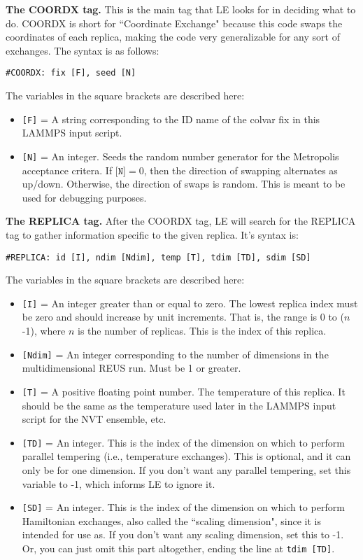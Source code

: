 \documentclass[10pt]{article}
\begin{document}
\textbf{The COORDX tag.}
This is the main tag that LE looks for in deciding what to do. COORDX is
short for ``Coordinate Exchange" because this code swaps the coordinates of each replica,
making the code very generalizable for any sort of exchanges.
The syntax is as follows:
\begin{verbatim}
#COORDX: fix [F], seed [N]
\end{verbatim}
The variables in the square brackets are described here:
\begin{itemize}
\item	\texttt{[F]} = A string corresponding to the ID name of the colvar fix
		in this LAMMPS input script.
\item	\texttt{[N]} = An integer. Seeds the random number generator for the Metropolis
		acceptance critera.
		If $\texttt{[N]} = 0$,
		then the direction of swapping alternates as up/down. Otherwise, the direction of swaps
		is random. This is meant to be used for debugging purposes.
\end{itemize}

\textbf{The REPLICA tag.}
After the COORDX tag, LE will search for the REPLICA tag to gather information specific
to the given replica. It's syntax is:
\begin{verbatim}
#REPLICA: id [I], ndim [Ndim], temp [T], tdim [TD], sdim [SD]
\end{verbatim}
The variables in the square brackets are described here:
\begin{itemize}
\item	\texttt{[I]} = An integer greater than or equal to zero. The lowest
		replica index must be zero and should increase by unit increments. That is,
		the range is 0 to ($n$-1), where $n$ is the number of replicas. This is
		the index of this replica.
\item	\texttt{[Ndim]} = An integer corresponding to the number of dimensions
		in the multidimensional REUS run. Must be 1 or greater.
\item	\texttt{[T]} = A positive floating point number. The temperature of this replica.
		It should be the same as the temperature used later in the LAMMPS input script
		for the NVT ensemble, etc.
\item	\texttt{[TD]} = An integer. This is the index of the dimension on which to perform
		parallel tempering (i.e., temperature exchanges). This is optional, and it can only be
		for one dimension. If you don't want any parallel tempering, set this variable to -1,
		which informs LE to ignore it.
\item   \texttt{[SD]} = An integer. This is the index of the dimension on which to perform
        Hamiltonian exchanges, also called the ``scaling dimension", since it is intended
        for use as. If you don't want any scaling dimension, set this to -1. Or, you
        can just omit this part altogether, ending the line at \texttt{tdim [TD]}.
\end{itemize}
\end{document}

